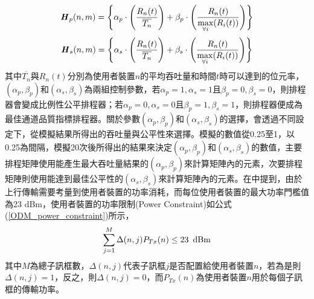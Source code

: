 \begin{equation}
\label{ODM_Pmetric}
\textbf{\textit{H}}_p(n,m)=\Bigg\{\alpha_p\cdot\Bigg(\dfrac{R_n(t)}{\overline{T_n}}\Bigg)+\beta_p\cdot\Bigg(\dfrac{R_n(t)}{\max\limits_{\forall i}(R_i(t))}\Bigg)\Bigg\}
\end{equation}
\begin{equation}
\label{ODM_Smetric}
\textbf{\textit{H}}_s(n,m)=\Bigg\{\alpha_s\cdot\Bigg(\dfrac{R_n(t)}{\overline{T_n}}\Bigg)+\beta_s\cdot\Bigg(\dfrac{R_n(t)}{\max\limits_{\forall i}(R_i(t))}\Bigg)\Bigg\}
\end{equation}
其中$\overline{T_n}$與$R_n(t)$分別為使用者裝置$n$的平均吞吐量和時間$t$時可以達到的位元率，$(\alpha_p,\beta_p)$和$(\alpha_s,\beta_s)$為兩組控制參數，若$\alpha_p=1,\alpha_s=1$且$\beta_p=0,\beta_s=0$，則排程器會變成比例性公平排程器；若$\alpha_p=0,\alpha_s=0$且$\beta_p=1,\beta_s=1$，則排程器便成為最佳通道品質指標排程器。關於參數$(\alpha_p,\beta_p)$和$(\alpha_s,\beta_s)$的選擇，會透過不同設定下，從模擬結果所得出的吞吐量與公平性來選擇。模擬的數值從0.25至1，以0.25為間隔，模擬20次後所得出的結果來決定$(\alpha_p,\beta_p)$和$(\alpha_s,\beta_s)$的數值，主要排程矩陣使用能產生最大吞吐量結果的$(\alpha_p,\beta_p)$來計算矩陣內的元素，次要排程矩陣則使用能達到最佳公平性的$(\alpha_s,\beta_s)$來計算矩陣內的元素。在\cite{kana2015}中提到，由於上行傳輸需要考量到使用者裝置的功率消耗，而每位使用者裝置的最大功率門檻值為23 dBm\cite{UE_spec}，使用者裝置的功率限制(Power Constraint)如公式(\ref{ODM_power_constraint})所示，
\begin{equation}
\label{ODM_power_constraint}
\sum\limits_{j=1}^M\Delta(n,j)P_{Tx}(n)\leq 23\enskip\textrm{dBm}
\end{equation}
其中$M$為總子訊框數，$\Delta(n,j)$代表子訊框$j$是否配置給使用者裝置$n$，若為是則$\Delta(n,j)=1$，反之，則$\Delta(n,j)=0$，而$P_{Tx}(n)$為使用者裝置$n$用於每個子訊框的傳輸功率。

